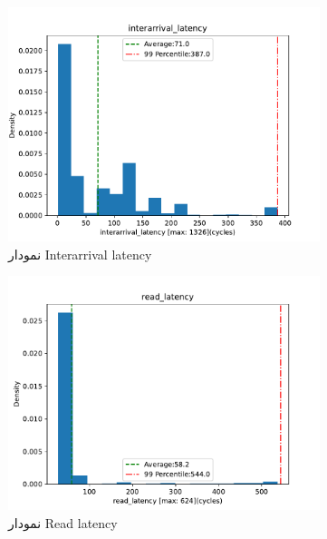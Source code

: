 \documentclass[12pt]{exam}
\begin{document}
\begin{questions}
\begin{figure}
	\centering
	\begin{subfigure}[b]{0.4\textwidth}
		\centering
		\includegraphics[width=1\textwidth]{images/img13}
		\caption{نمودار Interarrival latency}
		\label{نمودار Interarrival latency}
	\end{subfigure}
	\hfill
	\begin{subfigure}[b]{0.4\textwidth}
		\centering
		\includegraphics[width=1\textwidth]{images/img14}
		\caption{نمودار Read latency}
		\label{نمودار Read latency}
	\end{subfigure}
	\hfill
	\begin{subfigure}[b]{0.4\textwidth}
		\centering

\end{subfigure}
\end{figure}
\end{questions}
\end{document}

